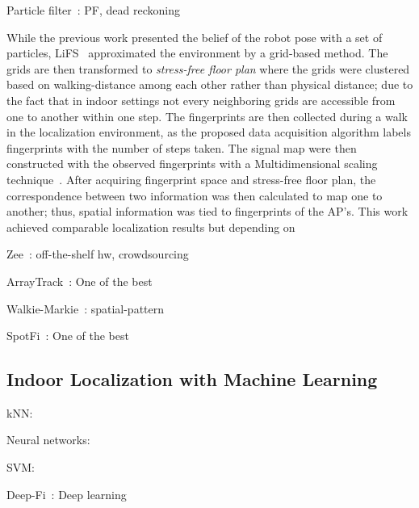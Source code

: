 \documentclass[letterpaper, 10 pt, conference]{ieeeconf}  %
\newcommand{\lorem}{
}
\begin{document}
    Particle filter~\cite{biswas2010wifi}: PF, dead reckoning
    \lorem{}
    While the previous work presented the belief of the robot pose with a set of particles, LiFS~\cite{yang2012locating} approximated the environment by a grid-based method.
    The grids are then transformed to \textit{stress-free floor plan} where the grids were clustered based on walking-distance among each other rather than physical distance; due to the fact that in indoor settings not every neighboring grids are accessible from one to another within one step.
    The fingerprints are then collected during a walk in the localization environment, as the proposed data acquisition algorithm labels fingerprints with the number of steps taken.
    The signal map were then constructed with the observed fingerprints with a Multidimensional scaling technique~\cite{borg2005modern}.
    After acquiring fingerprint space and stress-free floor plan, the correspondence between two information was then calculated to map one to another; thus, spatial information was tied to fingerprints of the AP's.
    This work achieved comparable localization results but depending on

    Zee~\cite{rai2012zee}: off-the-shelf hw, crowdsourcing
    \lorem{}

    ArrayTrack~\cite{xiong2013arraytrack}: One of the best
    \lorem{}

    Walkie-Markie~\cite{shen2013walkie}: spatial-pattern
    \lorem{}

    SpotFi~\cite{kotaru2015spotfi}: One of the best
    \lorem{}


  \subsection{Indoor Localization with Machine Learning}
    kNN:~\cite{liu2007survey}
    \lorem{}


    Neural networks:~\cite{dayekh2010cooperative}
    \lorem{}

    SVM:~\cite{wu2007location}
    \lorem{}

    Deep-Fi~\cite{wang2016csi}: Deep learning
    \lorem{}
\end{document}
